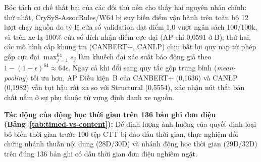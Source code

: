 \documentclass[12pt, a4paper, reqno, oneside]{book}
\begin{document}
Bóc tách cơ chế thất bại của các đối thủ nền cho thấy hai nguyên nhân chính: thứ nhất, CrySyS-AssocRules/W64 bị suy biến điểm vận hành trên toàn bộ 12 lượt chạy nguồn do tỷ lệ cửa sổ validation đạt điểm 1,0 vượt ngân sách 100/100k, và trên xe lạ 100\% cửa sổ đích nhận điểm cực đại (AP chỉ 0,0591 ở B); thứ hai, các mô hình cấp khung tin (CANBERT+, CANLP) chịu bất lợi quy nạp từ phép gộp cực đại $\max_{j=1}^{64} s_j$ làm khuếch đại xác suất báo động giả theo $1-(1-\epsilon)^{64} \approx 64\epsilon$. Ngay cả khi đổi sang quy tắc gộp trung bình (\textit{mean-pooling}) tối ưu hơn, AP Điều kiện~B của CANBERT+ (0,1636) và CANLP (0,1982) vẫn tụt hậu rất xa so với Structural (0,5554), xác nhận nút thắt bản chất nằm ở sự phụ thuộc từ vựng định danh xe nguồn.

\textbf{Tác động của động học thời gian trên 136 bản ghi đơn điệu (Bảng~\ref{tab:timed-vs-content}):} Để định lượng ảnh hưởng của quyết định loại bỏ biến thời gian trước 100 tệp CTT bị đảo dấu thời gian, thực nghiệm đối chứng nhánh thuần nội dung (28D/30D) và nhánh động học thời gian (29D/32D) trên đúng 136 bản ghi có dấu thời gian đơn điệu nghiêm ngặt.
\end{document}

